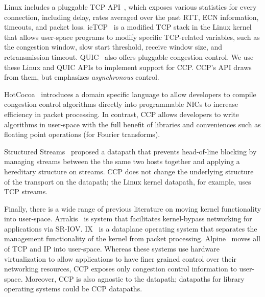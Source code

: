 Linux includes a pluggable TCP API~\cite{lwn-pluggable-tcp}, which exposes various statistics for every connection, including delay, rates averaged over the past RTT, ECN information, timeouts, and packet loss.
icTCP~\cite{icTCP} is a modified TCP stack in the Linux kernel that allows user-space programs to modify specific TCP-related variables, such as the congestion window, slow start threshold, receive window size, and retransmission timeout. 
QUIC~\cite{quic} also offers pluggable congestion control. 
We use these Linux and QUIC APIs to implement support for CCP. CCP's API draws from them, but emphasizes {\em asynchronous} control.

HotCocoa~\cite{hotcocoa} introduces a domain specific language to allow developers to compile congestion control algorithms directly into programmable NICs to increase efficiency in packet processing. In contrast, CCP allows developers to write algorithms in user-space with the full benefit of libraries and conveniences such as  floating point operations (\eg for Fourier transforms). 

Structured Streams~\cite{structuredstreams} proposed a datapath that prevents head-of-line blocking by managing streams between the the same two hosts together and applying a hereditary structure on streams. CCP does not change the underlying structure of the transport on the datapath; the Linux kernel datapath, for example, uses TCP streams. 

Finally, there is a wide range of previous literature on moving kernel functionality into user-space. 
Arrakis~\cite{arrakis2014} is system that facilitates kernel-bypass networking for applications via SR-IOV. 
IX~\cite{ix} is a dataplane operating system that separates the management functionality of the kernel from packet processing. 
Alpine~\cite{alpine} moves all of TCP and IP into user-space.
Whereas these systems use hardware virtualization to allow applications to have finer grained control over their networking resources,
CCP exposes only congestion control information to user-space. 
Moreover, CCP is also agnostic to the datapath; datapaths for library operating systems could be CCP datapaths.